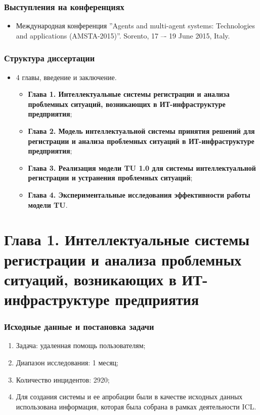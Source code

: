\documentclass[14pt]{beamer}
\begin{document}
\begin{frame}
\frametitle{Выступления на конференциях}

\begin{itemize}
	\item Международная конференция ”Agents and multi-agent systems: Technologies and applications (AMSTA-2015)”. Sorento, 17 –- 19 June 2015, Italy.
	
\end{itemize}
\end{frame}

\begin{frame}
\frametitle{Структура диссертации}
\begin{itemize}
\item 4 главы, введение и заключение.
\begin{itemize}
  \item \textbf{Глава 1. Интеллектуальные системы регистрации и анализа проблемных ситуаций, возникающих в ИТ-инфраструктуре предприятия};
  \item  \textbf{Глава 2. Модель интеллектуальной системы принятия решений для регистрации и анализа проблемных ситуаций в ИТ-инфраструктуре предприятия};
  \item \textbf{Глава 3. Реализация модели TU 1.0 для системы интеллектуальной регистрации и устранения проблемных ситуаций};
  \item \textbf{Глава 4. Экспериментальные исследования эффективности работы модели TU}.
 \end{itemize}
\end{itemize}
\end{frame}







%
%
\section[Глава 1]{Глава 1. Интеллектуальные системы регистрации и анализа проблемных ситуаций, возникающих в ИТ-инфраструктуре предприятия}
\begin{frame}
\frametitle{Исходные данные и постановка задачи}
\begin{enumerate}
  \item Задача: удаленная помощь пользователям;
  \item Диапазон исследования: 1 месяц;
  \item Количество инцидентов: 2920;
  \item Для создания системы и ее апробации были в качестве исходных данных использована информация, которая была собрана в рамках деятельности ICL.


\end{enumerate}
\end{frame}
\end{document}
